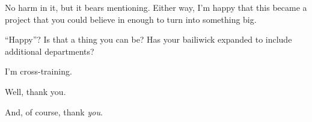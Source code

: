 \begin{paracol}{2}
\begin{rightcolumn}
  \begin{ally}
    No harm in it, but it bears mentioning. Either way, I'm happy that this became a project that you could believe in enough to turn into something big.
  \end{ally}
  ``Happy''? Is that a thing you can be? Has your bailiwick expanded to include additional departments?

  \begin{ally}
    I'm cross-training.
  \end{ally}
  Well, thank you.
  \vfill

  \noindent And, of course, thank \emph{you}.
\end{rightcolumn}
\end{paracol}
